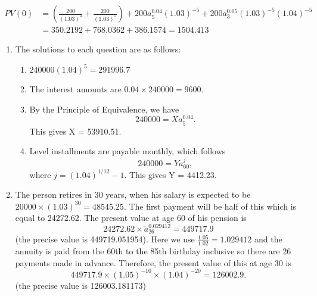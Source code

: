 \documentclass[
]{article}
\providecommand{\tightlist}{%
  \setlength{\itemsep}{0pt}\setlength{\parskip}{0pt}}
\theoremstyle{definition}
\theoremstyle{definition}
\theoremstyle{definition}
\theoremstyle{definition}
\theoremstyle{remark}
\begin{document}
\[\begin{aligned}
    PV(0) &= \left( \frac{200}{(1.03)^4} + \frac{200}{(1.03)^5}\right) + 200 a^{0.04}_5 (1.03)^{-5} + 200 a^{0.05}_{3} (1.03)^{-5} (1.04)^{-5} \\
    &= 350.2192 + 768.0362 + 386.1574 = 1504.413
\end{aligned}\]

\begin{enumerate}
\def\labelenumi{\arabic{enumi}.}
\setcounter{enumi}{2}
\item
  The solutions to each question are as follows:

  \begin{enumerate}
  \def\labelenumii{\arabic{enumii}.}
  \tightlist
  \item
    \(240000 (1.04)^5 = 291996.7\)
  \item
    The interest amounts are \(0.04\times 240000 = 9600.\)
  \item
    By the Principle of Equivalence, we have
    \[ 240000 = X a^{0.04}_{5}. \]
    This gives X = 53910.51.
  \item
    Level installments are payable monthly, which follows
    \[ 240000 = Y a^{j}_{60}, \]
    where \(j = (1.04)^{1/12} - 1\). This gives Y = 4412.23.
  \end{enumerate}
\item
  The person retires in 30 years, when his salary is expected to be
  \(20000 \times (1.03)^{30} = 48545.25.\)
  The first payment will be half of this which is equal to 24272.62.
  The present value at age 60 of his pension is
  \[  24272.62 \times \ddot{a}^{0.029412}_{26} = 449717.9\] (the precise value is 449719.051954).
  Here we use \(\frac{1.05}{1.02} = 1.029412\) and the annuity is paid from the 60th to the 85th birthday inclusive so there are 26 payments made in advance.
  Therefore, the present value of this at age 30 is
  \[ 449717.9 \times (1.05)^{-10} \times (1.04)^{-20} = 126002.9. \]
  (the precise value is 126003.181173)
\end{enumerate}
\end{document}
